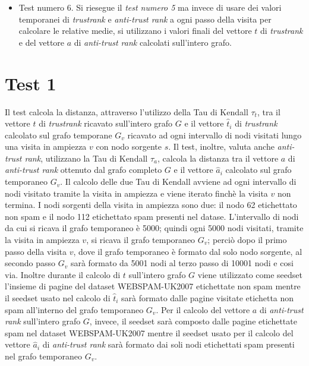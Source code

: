 \begin{itemize}
 \item Test numero 6. Si riesegue il \textit{test numero 5} ma invece di usare dei valori temporanei di \textit{trustrank} e \textit{anti-trust rank} a ogni passo della visita per calcolare le relative medie, si utilizzano i valori finali del vettore \(t\) di \textit{trustrank} e del vettore  \(a\) di \textit{anti-trust rank} calcolati sull'intero grafo.
 \end{itemize}
 
\section{Test 1}
 Il test calcola la distanza, attraverso l'utilizzo  della Tau di Kendall \(\tau_t\), tra il vettore \(t\) di \textit{trustrank} ricavato sull'intero grafo \(G\) e il vettore \(\hat{t}_i\) di \textit{trustrank} calcolato sul grafo temporane \(G_v\) ricavato ad ogni intervallo di nodi visitati lungo una visita in ampiezza \(v\) con nodo sorgente \(s\). Il test, inoltre, valuta anche \textit{anti-trust rank}, utilizzano  la Tau di Kendall \(\tau_a\), calcola la distanza  tra il vettore \(a\) di \textit{anti-trust rank} ottenuto dal grafo completo \(G\) e il vettore \(\hat{a}_i\)  calcolato sul grafo temporaneo \(G_v\). Il calcolo delle due Tau di Kendall avviene ad ogni intervallo di nodi visitato tramite la visita in ampiezza e viene iterato finchè la visita \(v\) non termina.
 I nodi sorgenti della visita in ampiezza sono due: il nodo 62 etichettato non spam e il nodo 112 etichettato spam presenti nel datase. L'intervallo di nodi da cui si ricava il grafo temporaneo è 5000; quindi ogni 5000 nodi visitati, tramite la visita in ampiezza \(v\), si ricava il grafo temporaneo \(G_v\); perciò dopo il primo passo della visita \(v\), dove il grafo temporaneo è formato dal solo nodo sorgente, al secondo passo \(G_v\) sarà formato da 5001 nodi al terzo passo di 10001 nodi e cosi via. Inoltre durante il calcolo di \(t\) sull'intero grafo \(G\) viene utilizzato come seedset l'insieme di pagine del dataset WEBSPAM-UK2007 etichettate  non spam mentre il seedset usato nel calcolo di \(\hat{t}_i\)  sarà formato dalle pagine visitate etichetta non spam all'interno del grafo temporaneo \(G_v\). Per il calcolo del vettore \(a\) di \textit{anti-trust rank} sull'intero grafo \(G\), invece, il seedset sarà composto dalle pagine etichettate spam nel dataset WEBSPAM-UK2007 mentre il seedset usato per il calcolo del vettore \(\hat{a}_i\) di \textit{anti-trust rank} sarà formato dai soli nodi  etichettati spam presenti nel grafo temporaneo \(G_v\).

